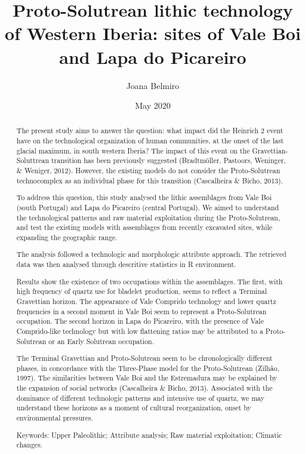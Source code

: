 \documentclass[12pt,twoside]{reedthesis}
\title{Proto-Solutrean lithic technology of Western Iberia: sites of Vale Boi and Lapa do Picareiro}
\author{Joana Belmiro}
\date{May 2020}
\begin{document}
  \maketitle

\frontmatter %


  \begin{abstract}
    The present study aims to answer the question: what impact did the Heinrich 2 event have on the technological organization of human communities, at the onset of the last glacial maximum, in south western Iberia? The impact of this event on the Gravettian-Soluttrean transition has been previously suggested (Bradtmöller, Pastoors, Weninger, \& Weniger, 2012). However, the existing models do not consider the Proto-Solutrean technocomplex as an individual phase for this transition (Cascalheira \& Bicho, 2013).
    
    \par
    
    To address this question, this study analysed the lithic assemblages from Vale Boi (south Portugal) and Lapa do Picareiro (central Portugal). We aimed to understand the technological patterns and raw material exploitation during the Proto-Solutrean, and test the existing models with assemblages from recently excavated sites, while expanding the geographic range.
    
    The analysis followed a technologic and morphologic attribute approach. The retrieved data was then analysed through descritive statistics in R environment.
    
    Results show the existence of two occupations within the assemblages. The first, with high frequency of quartz use for bladelet production, seems to reflect a Terminal Gravettian horizon. The appearance of Vale Comprido technology and lower quartz frequencies in a second moment in Vale Boi seem to represent a Proto-Solutrean occupation. The second horizon in Lapa do Picareiro, with the presence of Vale Comprido-like technology but with low flattening ratios may be attributed to a Proto-Solutrean or an Early Solutrean occupation.
    
    The Terminal Gravettian and Proto-Solutrean seem to be chronologically different phases, in concordance with the Three-Phase model for the Proto-Solutrean (Zilhão, 1997). The similarities between Vale Boi and the Estremadura may be explained by the expansion of social networks (Cascalheira \& Bicho, 2013). Associated with the dominance of different technologic patterns and intensive use of quartz, we may understand these horizons as a moment of cultural reorganization, onset by environmental pressures.
    
    Keywords: Upper Paleolithic; Attribute analysis; Raw material exploitation; Climatic changes.
  \end{abstract}
\end{document}
